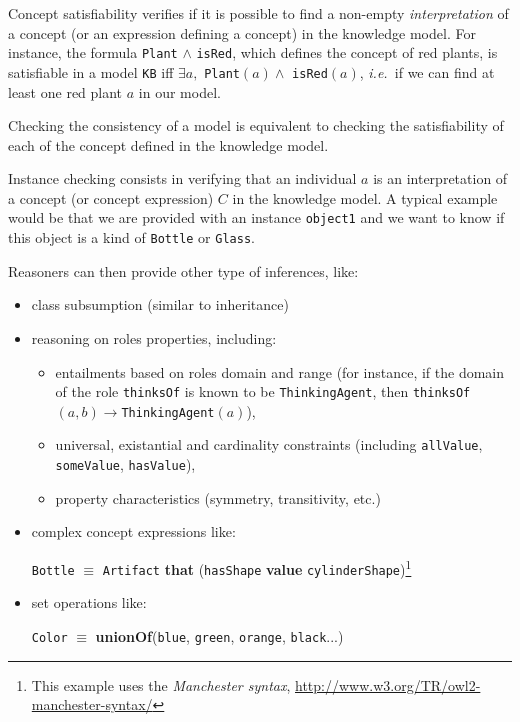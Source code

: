 \documentclass[a4paper, twocolumn]{article}
\newcommand{\concept}[1]{{\footnotesize \texttt{#1}}}
\newcommand{\ie}{{\textit{i.e.~}}}
\begin{document}
Concept satisfiability verifies if it is possible to find a non-empty
\emph{interpretation} of a concept (or an expression defining a concept) in the
knowledge model. For instance, the formula \concept{Plant} $\land$
\concept{isRed}, which defines the concept of red plants, is satisfiable in a
model \concept{KB} iff $\exists a, $ \concept{Plant}$(a) \land$
\concept{isRed}$(a)$, \ie if we can find at least one red plant $a$ in our
model.

Checking the consistency of a model is equivalent to checking the
satisfiability of each of the concept defined in the knowledge model.

Instance checking consists in verifying that an individual $a$ is an
interpretation of a concept (or concept expression) $C$ in the knowledge model.
A typical example would be that we are provided with an instance
\concept{object1} and we want to know if this object is a kind of
\concept{Bottle} or \concept{Glass}.

Reasoners can then provide other type of inferences, like:

\begin{itemize}
    \item class subsumption (similar to inheritance)

    \item reasoning on roles properties, including:
        \begin{itemize}
        \item entailments based on roles domain and range (for instance, if the
        domain of the role \concept{thinksOf} is known to be
        \concept{ThinkingAgent}, then \concept{thinksOf}$(a, b) \to
        $\concept{ThinkingAgent}$(a)$),

        \item universal, existantial and cardinality constraints (including \concept{allValue}, 
        \concept{someValue}, \concept{hasValue}),

        \item property characteristics (symmetry, transitivity, etc.)

        \end{itemize}

    \item complex concept expressions like: \par \footnotesize \concept{Bottle}
    $\equiv$ \concept{Artifact} {\bf that} (\concept{hasShape} {\bf value}
    \concept{cylinderShape})\footnote{This example uses the \emph{Manchester
    syntax}, \url{http://www.w3.org/TR/owl2-manchester-syntax/}} \normalsize

    \item set operations like: \par \footnotesize \concept{Color} $\equiv$ {\bf
    unionOf}(\concept{blue}, \concept{green}, \concept{orange},
    \concept{black}...) \normalsize

\end{itemize}
\end{document}
